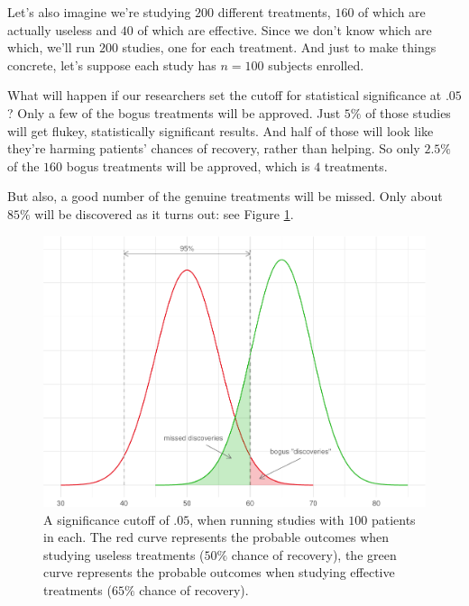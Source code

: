 \documentclass[justified]{tufte-book}
\theoremstyle{definition}
\theoremstyle{definition}
\theoremstyle{definition}
\theoremstyle{remark}
\begin{document}
Let's also imagine we're studying \(200\) different treatments, \(160\) of which are actually useless and \(40\) of which are effective. Since we don't know which are which, we'll run \(200\) studies, one for each treatment. And just to make things concrete, let's suppose each study has \(n = 100\) subjects enrolled.

What will happen if our researchers set the cutoff for statistical significance at \(.05\)? Only a few of the bogus treatments will be approved. Just \(5\%\) of those studies will get flukey, statistically significant results. And half of those will look like they're harming patients' chances of recovery, rather than helping. So only \(2.5\%\) of the \(160\) bogus treatments will be approved, which is \(4\) treatments.

But also, a good number of the genuine treatments will be missed. Only about \(85\%\) will be discovered as it turns out: see Figure \ref{fig:hundredstudies}.

\begin{figure}
\includegraphics{_main_files/figure-latex/hundredstudies-1} \caption[A significance cutoff of $.05$, when running studies with $100$ patients in each]{A significance cutoff of $.05$, when running studies with $100$ patients in each. The red curve represents the probable outcomes when studying useless treatments ($50\%$ chance of recovery), the green curve represents the probable outcomes when studying effective treatments ($65\%$ chance of recovery).}\label{fig:hundredstudies}
\end{figure}
\end{document}
